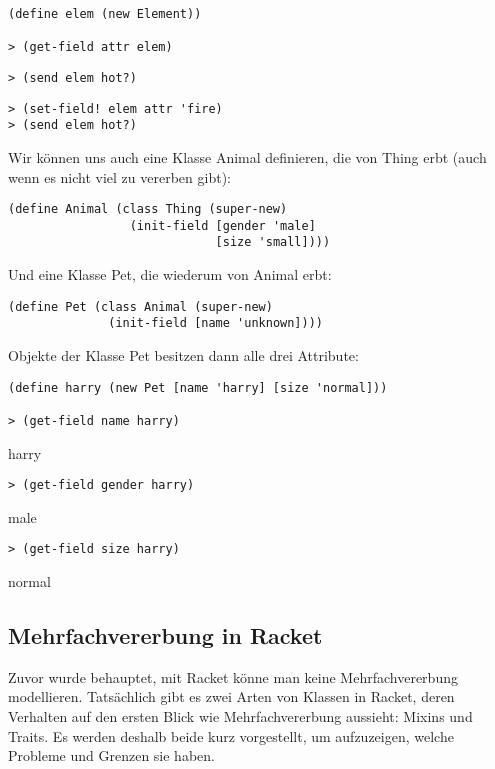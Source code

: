 \begin{lstlisting}
(define elem (new Element))

> (get-field attr elem)
\end{lstlisting} 
{}
\begin{lstlisting}
> (send elem hot?)
\end{lstlisting} 
{}

\begin{lstlisting}
> (set-field! elem attr 'fire)
> (send elem hot?)
\end{lstlisting} 
{}
% 
% 

Wir können uns auch eine Klasse Animal definieren, die von Thing erbt (auch wenn es nicht viel zu vererben gibt):

\begin{lstlisting}
(define Animal (class Thing (super-new)
                 (init-field [gender 'male]
                             [size 'small])))
\end{lstlisting} 

Und eine Klasse Pet, die wiederum von Animal erbt:

\begin{lstlisting}
(define Pet (class Animal (super-new)
              (init-field [name 'unknown])))
\end{lstlisting} 

Objekte der Klasse Pet besitzen dann alle drei Attribute:

\begin{lstlisting}
(define harry (new Pet [name 'harry] [size 'normal]))

> (get-field name harry)
\end{lstlisting} 
{\rsymbol harry}

\begin{lstlisting}
> (get-field gender harry)
\end{lstlisting} 
{\rsymbol male}

\begin{lstlisting}
> (get-field size harry)
\end{lstlisting} 
{\rsymbol normal}

\subsection{Mehrfachvererbung in Racket}
\label{mixins}
Zuvor wurde behauptet, mit Racket könne man keine Mehrfachvererbung modellieren. Tatsächlich gibt es zwei Arten von Klassen in Racket, deren Verhalten auf den ersten Blick wie Mehrfachvererbung aussieht: Mixins und Traits. Es werden deshalb beide kurz vorgestellt, um aufzuzeigen, welche Probleme und Grenzen sie haben.

